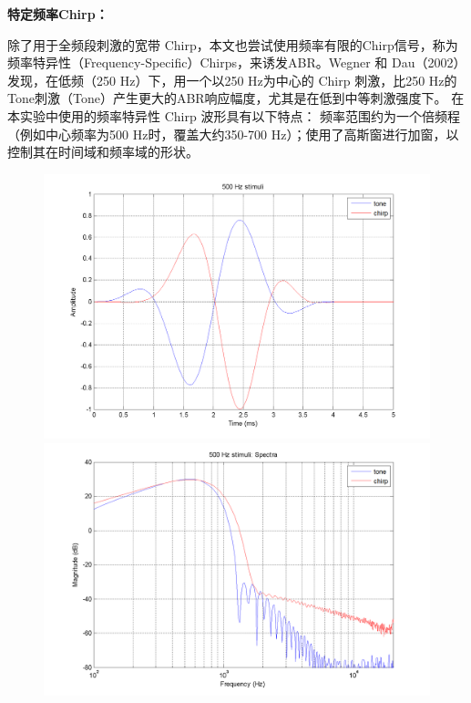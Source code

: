 \textbf{特定频率Chirp：}

除了用于全频段刺激的宽带 Chirp，本文也尝试使用频率有限的Chirp信号，称为频率特异性（Frequency-Specific）Chirps，来诱发ABR。Wegner 和 Dau（2002）发现，在低频（250 Hz）下，用一个以250 Hz为中心的 Chirp 刺激，比250 Hz的Tone刺激（Tone）产生更大的ABR响应幅度，尤其是在低到中等刺激强度下。
在本实验中使用的频率特异性 Chirp 波形具有以下特点：
频率范围约为一个倍频程（例如中心频率为500 Hz时，覆盖大约350-700 Hz）；使用了高斯窗进行加窗，以控制其在时间域和频率域的形状。

\begin{figure}[H]
    \centering
    \begin{minipage}{0.48\textwidth}
        \includegraphics[width=\textwidth]{images/500hzStimuli.png}
    \end{minipage}
    \hfill
    \begin{minipage}{0.48\textwidth}
        \includegraphics[width=\textwidth]{images/500hzSpectra.png}
    \end{minipage}
    

\end{figure}
